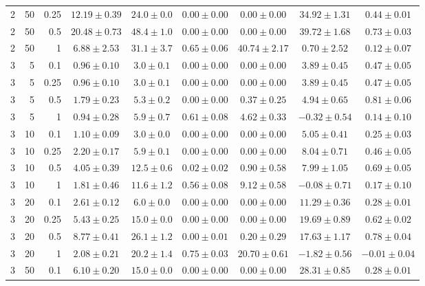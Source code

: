 \begin{table}[htbp]
\begin{tabular}{@{}rrrcccccc@{}}
2 & 50 & 0.25 & $12.19 \pm 0.39$ & $24.0 \pm 0.0$ & $0.00 \pm 0.00$ & $0.00 \pm 0.00$ & $34.92 \pm 1.31$ & $0.44 \pm 0.01$ \\
2 & 50 & 0.5 & $20.48 \pm 0.73$ & $48.4 \pm 1.0$ & $0.00 \pm 0.00$ & $0.00 \pm 0.00$ & $39.72 \pm 1.68$ & $0.73 \pm 0.03$ \\
2 & 50 & 1 & $6.88 \pm 2.53$ & $31.1 \pm 3.7$ & $0.65 \pm 0.06$ & $40.74 \pm 2.17$ & $0.70 \pm 2.52$ & $0.12 \pm 0.07$ \\
\midrule
3 & 5 & 0.1 & $0.96 \pm 0.10$ & $3.0 \pm 0.1$ & $0.00 \pm 0.00$ & $0.00 \pm 0.00$ & $3.89 \pm 0.45$ & $0.47 \pm 0.05$ \\
3 & 5 & 0.25 & $0.96 \pm 0.10$ & $3.0 \pm 0.1$ & $0.00 \pm 0.00$ & $0.00 \pm 0.00$ & $3.89 \pm 0.45$ & $0.47 \pm 0.05$ \\
3 & 5 & 0.5 & $1.79 \pm 0.23$ & $5.3 \pm 0.2$ & $0.00 \pm 0.00$ & $0.37 \pm 0.25$ & $4.94 \pm 0.65$ & $0.81 \pm 0.06$ \\
3 & 5 & 1 & $0.94 \pm 0.28$ & $5.9 \pm 0.7$ & $0.61 \pm 0.08$ & $4.62 \pm 0.33$ & $-0.32 \pm 0.54$ & $0.14 \pm 0.10$ \\
3 & 10 & 0.1 & $1.10 \pm 0.09$ & $3.0 \pm 0.0$ & $0.00 \pm 0.00$ & $0.00 \pm 0.00$ & $5.05 \pm 0.41$ & $0.25 \pm 0.03$ \\
3 & 10 & 0.25 & $2.20 \pm 0.17$ & $5.9 \pm 0.1$ & $0.00 \pm 0.00$ & $0.00 \pm 0.00$ & $8.04 \pm 0.71$ & $0.46 \pm 0.05$ \\
3 & 10 & 0.5 & $4.05 \pm 0.39$ & $12.5 \pm 0.6$ & $0.02 \pm 0.02$ & $0.90 \pm 0.58$ & $7.99 \pm 1.05$ & $0.69 \pm 0.05$ \\
3 & 10 & 1 & $1.81 \pm 0.46$ & $11.6 \pm 1.2$ & $0.56 \pm 0.08$ & $9.12 \pm 0.58$ & $-0.08 \pm 0.71$ & $0.17 \pm 0.10$ \\
3 & 20 & 0.1 & $2.61 \pm 0.12$ & $6.0 \pm 0.0$ & $0.00 \pm 0.00$ & $0.00 \pm 0.00$ & $11.29 \pm 0.36$ & $0.28 \pm 0.01$ \\
3 & 20 & 0.25 & $5.43 \pm 0.25$ & $15.0 \pm 0.0$ & $0.00 \pm 0.00$ & $0.00 \pm 0.00$ & $19.69 \pm 0.89$ & $0.62 \pm 0.02$ \\
3 & 20 & 0.5 & $8.77 \pm 0.41$ & $26.1 \pm 1.2$ & $0.00 \pm 0.01$ & $0.20 \pm 0.29$ & $17.63 \pm 1.17$ & $0.78 \pm 0.04$ \\
3 & 20 & 1 & $2.08 \pm 0.21$ & $20.2 \pm 1.4$ & $0.75 \pm 0.03$ & $20.70 \pm 0.61$ & $-1.82 \pm 0.56$ & $-0.01 \pm 0.04$ \\
3 & 50 & 0.1 & $6.10 \pm 0.20$ & $15.0 \pm 0.0$ & $0.00 \pm 0.00$ & $0.00 \pm 0.00$ & $28.31 \pm 0.85$ & $0.28 \pm 0.01$ \\

\end{tabular}
\end{table}
